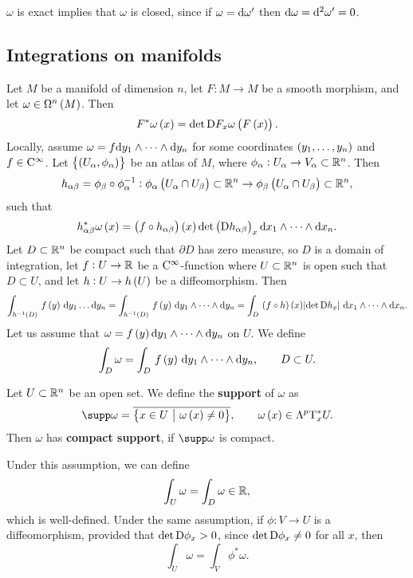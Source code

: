 $ \omega $ is exact implies that $ \omega $ is closed, since if $ \omega = \mathrm{d}\omega' $ then $ \mathrm{d}\omega = \mathrm{d}^2\omega' = 0 $.

\subsection{Integrations on manifolds}

Let $ M $ be a manifold of dimension $ n $, let $ F : M \to M $ be a smooth morphism, and let $ \omega \in \Omega^n\br{M} $. Then
$$ F^*\omega\br{x} = \det \D F_x\omega\br{F\br{x}}. $$
Locally, assume $ \omega = f \mathrm{d} y_1 \wedge \dots \wedge \mathrm{d} y_n $ for some coordinates $ \br{y_1, \dots, y_n} $ and $ f \in \mathrm{C}^\infty $. Let $ \cbr{\br{U_\alpha, \phi_\alpha}} $ be an atlas of $ M $, where $ \phi_\alpha : U_\alpha \to V_\alpha \subset \mathbb{R}^n $. Then
$$ h_{\alpha\beta} = \phi_\beta \circ \phi_\alpha^{-1} : \phi_\alpha\br{U_\alpha \cap U_\beta} \subset \RR^n \to \phi_\beta\br{U_\alpha \cap U_\beta} \subset \RR^n, $$
such that
$$ h_{\alpha\beta}^*\omega\br{x} = \br{f \circ h_{\alpha\beta}}\br{x}\det \br{\D h_{\alpha\beta}}_x \d x_1 \wedge \dots \wedge \d x_n. $$
Let $ D \subset \mathbb{R}^n $ be compact such that $ \partial D $ has zero measure, so $ D $ is a domain of integration, let $ f : U \to \mathbb{R} $ be a $ \mathrm{C}^\infty $-function where $ U \subset \mathbb{R}^n $ is open such that $ D \subset U $, and let $ h : U \to h\br{U} $ be a diffeomorphism. Then
$$ \intd{h^{-1}\br{D}}{}{f\br{y}}{y_1 \dots \d y_n} = \intd{h^{-1}\br{D}}{}{f\br{y}}{y_1 \wedge \dots \wedge \d y_n} = \intd{D}{}{\br{f \circ h}\br{x}\abs{\det \D h_x}}{x_1 \wedge \dots \wedge \d x_n}. $$
Let us assume that $ \omega = f\br{y}\d y_1 \wedge \dots \wedge \d y_n $ on $ U $. We define
$$ \int_D \omega = \intd{D}{}{f\br{y}}{y_1 \wedge \dots \wedge \d y_n}, \qquad D \subset U. $$

\begin{definition}
Let $ U \subset \mathbb{R}^n $ be an open set. We define the \textbf{support} of $ \omega $ as
$$ \supp \omega = \overline{\cbr{x \in U \st \omega\br{x} \ne 0}}, \qquad \omega\br{x} \in \Lambda^p\T_x^*U. $$
Then $ \omega $ has \textbf{compact support}, if $ \supp \omega $ is compact.
\end{definition}

\begin{fact*}
Under this assumption, we can define
$$ \int_U \omega = \int_D \omega \in \mathbb{R}, $$
which is well-defined. Under the same assumption, if $ \phi : V \to U $ is a diffeomorphism, provided that $ \det \mathrm{D}\phi_x > 0 $, since $ \det \mathrm{D}\phi_x \ne 0 $ for all $ x $, then
$$ \int_U \omega = \int_V \phi^*\omega. $$
\end{fact*}

